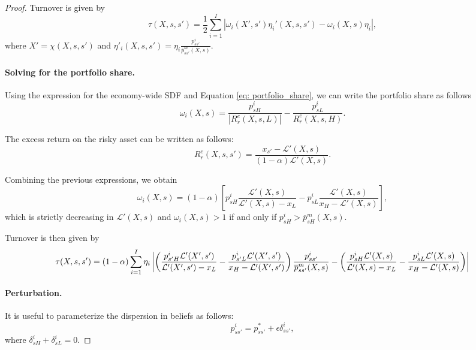 \begin{proof}    
    Turnover is given by
    \begin{equation}
        \tau(X,s, s') = \frac{1}{2} \sum_{i=1}^I | \omega_i(X', s') \eta_i'(X,s,s')  - \omega_i(X,s) \eta_i |,
    \end{equation}
    where $X' = \chi(X,s,s')$ and $\eta'_i(X,s,s') = \eta_i \frac{p_{ss'}^i}{\overline{p}_{ss'}^m(X,s)} $.
    
    \paragraph{Solving for the portfolio share.} Using the expression for the economy-wide SDF and Equation \eqref{eq: portfolio_share}, we can write the portfolio share as follows
    \begin{equation}\label{app:omega_returns}
    \omega_{i}(X,s) =  \frac{p^i_{sH}}{|R_r^e(X,s,L)|} -  \frac{p^i_{sL}}{R_r^e(X,s,H)}. 
    \end{equation}

    The excess return on the risky asset can be written as follows:\small
    \begin{equation}
        R_{r}^e(X,s,s') =  \frac{x_{s'} -\mathcal{L}'(X,s)}{(1 - \alpha) \mathcal{L}'(X,s) }.
    \end{equation}\normalsize

    Combining the previous expressions, we obtain
    \begin{equation}
    \omega_{i}(X,s) = (1-\alpha) \left[p_{sH}^i \frac{ \mathcal{L}'(X,s)}{\mathcal{L}'(X,s) - x_L}- p_{sL}^i \frac{\mathcal{L}'(X,s)}{x_H - \mathcal{L}'(X,s)} \right],
    \end{equation}
    which is strictly decreasing in $\mathcal{L}'(X,s)$ and $\omega_{i}(X,s)  > 1$ if and only if $p_{sH}^i > \overline{p}^m_{sH}(X,s)$. 


    Turnover is then given by
    \begin{equation}\footnotesize
        \tau(X,s,s') = (1-\alpha) \sum_{i=1}^I \eta_i \left\lvert \left(  \frac{ p_{s'H}^i \mathcal{L}'(X',s')}{\mathcal{L}'(X',s') - x_L}-  \frac{p_{s'L}^i\mathcal{L}'(X',s')}{x_H - \mathcal{L}'(X',s')}\right) \frac{p_{ss'}^i}{\overline{p}_{ss'}^m(X,s)}   - \left(  \frac{p_{sH}^i \mathcal{L}'(X,s)}{\mathcal{L}'(X,s) - x_L}-  \frac{p_{sL}^i\mathcal{L}'(X,s)}{x_H - \mathcal{L}'(X,s)}\right)  \right\rvert 
    \end{equation}\normalsize    

    \paragraph{Perturbation.} It is useful to parameterize the dispersion in beliefs as follows:
\begin{equation}
    p_{ss'}^i = p_{ss'}^* + \epsilon \delta_{ss'}^i,
\end{equation}
where $\delta_{sH}^i + \delta_{sL}^i = 0$. 


\end{proof}
